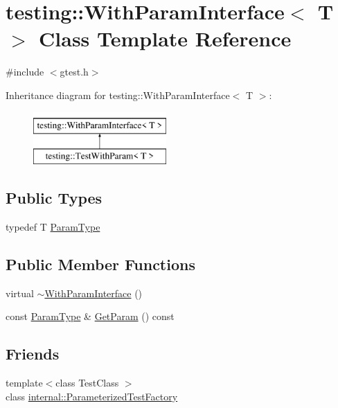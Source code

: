 \hypertarget{classtesting_1_1WithParamInterface}{}\section{testing\+::With\+Param\+Interface$<$ T $>$ Class Template Reference}
\label{classtesting_1_1WithParamInterface}


{\ttfamily \#include $<$gtest.\+h$>$}

Inheritance diagram for testing\+::With\+Param\+Interface$<$ T $>$\+:\begin{figure}[H]
\begin{center}
\leavevmode
\includegraphics[height=2.000000cm]{classtesting_1_1WithParamInterface}
\end{center}
\end{figure}
\subsection*{Public Types}
\begin{DoxyCompactItemize}
\item 
typedef T \mbox{\hyperlink{classtesting_1_1WithParamInterface_a343febaaebf1f025bda484f841d4fec1}{Param\+Type}}
\end{DoxyCompactItemize}
\subsection*{Public Member Functions}
\begin{DoxyCompactItemize}
\item 
virtual \mbox{\hyperlink{classtesting_1_1WithParamInterface_a4e170bd42fa5e8ce48b80cee6bb52e26}{$\sim$\+With\+Param\+Interface}} ()
\item 
const \mbox{\hyperlink{classtesting_1_1WithParamInterface_a343febaaebf1f025bda484f841d4fec1}{Param\+Type}} \& \mbox{\hyperlink{classtesting_1_1WithParamInterface_aa7b9028f06ee7ec1174bb25317b07eb2}{Get\+Param}} () const
\end{DoxyCompactItemize}
\subsection*{Friends}
\begin{DoxyCompactItemize}
\item 
{\footnotesize template$<$class Test\+Class $>$ }\\class \mbox{\hyperlink{classtesting_1_1WithParamInterface_a7543eb7df89f00fff517dba24bc11dd5}{internal\+::\+Parameterized\+Test\+Factory}}
\end{DoxyCompactItemize}


